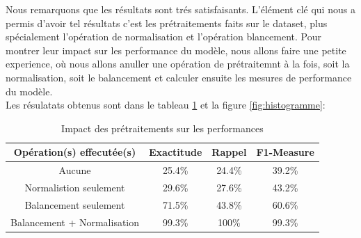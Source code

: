 Nous remarquons que les résultats sont trés satisfaisants. L'élément clé qui nous a permis d'avoir tel résultats c'est les prétraitements faits sur le dataset, plus spécialement l'opération de normalisation et l'opération blancement. Pour montrer leur impact  sur les performance du modèle, nous allons faire une petite experience, où nous allons anuller une opération de prétraitemnt à la fois, soit la normalisation, soit le balancement et calculer ensuite les mesures de performance du modèle.\\

Les résulatats obtenus sont dans le tableau \ref{table:compare} et la figure \ref{fig:histogramme}:

\begin{table}[t]
	\begin{center}
		\begin{tabular}{  | c | c | c | c | }
			\hline
			 Opération(s) effecutée(s) & Exactitude & Rappel & F1-Measure \\
			\hline
			\hline
			Aucune & 25.4\% & 24.4\% & 39.2\% \\
			\hline
			Normalistion seulement & 29.6\% & 27.6\% & 43.2\% \\
			\hline
			Balancement seulement & 71.5\% & 43.8\% & 60.6\% \\
			\hline
			\rowcolor[rgb]{0.9,0.70,0.70}
			Balancement + Normalisation & 99.3\% & 100\% & 99.3\% \\
			\hline
		\end{tabular}
		\caption{Impact des prétraitements sur les performances}
		\label{table:compare}
	\end{center}	
\end{table}

